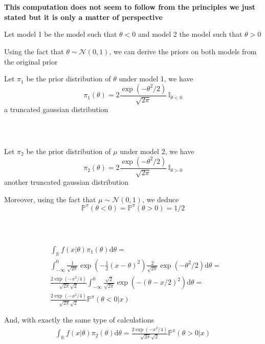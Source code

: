 \documentclass[notes,professionalfont,11pt,usenames,dvipsnames]{beamer}
\renewcommand{\mathcal}{\mathscr}
\renewcommand{\mathcal}{\mathscr}
\renewcommand{\P}{\mathbb{P}}
\newcommand\justify{\rightskip0pt \leftskip0pt}
\newenvironment{slide}
{\begin{frame}[environment=slide]
\frametitle{\insertsection \\ \insertsubsection}\justify\setlength{\parskip}{0.5cm}\vspace{-1.5cm}}
{\end{frame}}
\begin{document}
\begin{slide}

{\bf \color{red} This computation does not seem to follow from the principles we just stated
but it is only a matter of perspective}

Let model 1 be the model such that $\theta<0$ and model 2 the model such that $\theta>0$ 

Using the fact that $\theta\sim\mathcal{N}(0,1)$, we can derive the priors on both models from the original prior 

Let $\pi_1$ be the prior distribution of $\theta$ under model 1, we have
$$
\pi_1(\theta) = 2\dfrac{\exp(-\theta^2/2)}{\sqrt{2\pi}}\,\mathbb{I}_{\theta<0}
$$
a truncated gaussian distribution

\end{slide}

\begin{slide}

Let $\pi_2$ be the prior distribution of $\mu$ under model 2, we have
$$
\pi_2(\theta) = 2\dfrac{\exp(-\theta^2/2)}{\sqrt{2\pi}}\,\mathbb{I}_{\theta>0}
$$
another truncated gaussian distribution

Moreover, using the fact that $\mu\sim\mathcal{N}(0,1)$, we deduce
$$
\P^\pi(\theta<0) = \P^\pi(\theta>0) = 1/2
$$

\end{slide}

\begin{slide}

\begin{equation*}
\begin{split}
 & \int_\mathbb{R} f(x|\theta)\pi_1(\theta)\text{d}\theta= \\
 & \int_{-\infty}^0 \frac{1}{\sqrt{2\pi}} \exp\left(-\frac{1}{2}(x-\theta) ^2\right)\frac{2}{\sqrt{2\pi}}\exp(-\theta^2/2)\text{d}\theta= \\
 & \frac{2\exp(-x^2/4)}{\sqrt{2\pi}\sqrt{2}}\int_{-\infty}^0 \frac{\sqrt{2}}{\sqrt{2\pi}}\exp\left(-(\theta-x/2) ^2\right)\text{d}\theta=\\
 & \frac{2\exp(-x^2/4)}{\sqrt{2\pi}\sqrt{2}}\P^\pi(\theta<0|x)
\end{split}
\end{equation*}

And, with exactly the same type of calculations
\begin{equation*}
\begin{split}
\int_\mathbb{R} f(x|\theta)\pi_2(\theta)\text{d}\theta = \frac{2\exp(-x^2/4)}{\sqrt{2\pi}\sqrt{2}}\P^\pi(\theta>0|x)
\end{split}
\end{equation*}

\end{slide}
\end{document}
